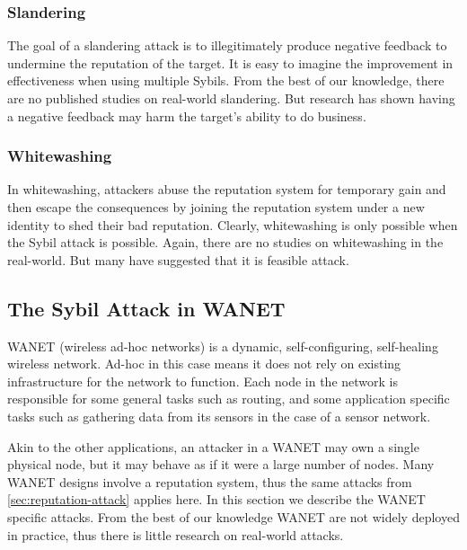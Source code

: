 \subsubsection{Slandering}
The goal of a slandering attack is to illegitimately produce negative feedback
to undermine the reputation of the target. It is easy to imagine the improvement
in effectiveness when using multiple Sybils. From the best of our knowledge,
there are no published studies on real-world slandering. But
research has shown having a negative feedback may harm the target's ability to
do business\cite{ba2002evidence}.

\subsubsection{Whitewashing}
In whitewashing, attackers abuse the reputation system for temporary gain and
then escape the consequences by joining the reputation system under a new
identity to shed their bad reputation. Clearly, whitewashing is only possible
when the Sybil attack is possible. Again, there are no studies on whitewashing
in the real-world. But many have suggested that it is feasible
attack\cite{hoffman2009survey, marti2006taxonomy}.


\subsection{The Sybil Attack in WANET}
WANET (wireless ad-hoc networks) is a dynamic, self-configuring, self-healing
wireless network. Ad-hoc in this case means it does not rely on existing
infrastructure for the network to function. Each node in the network is
responsible for some general tasks such as routing, and some application
specific tasks such as gathering data from its sensors in the case of a sensor
network.

Akin to the other applications, an attacker in a WANET may own a single physical
node, but it may behave as if it were a large number of nodes. Many WANET
designs involve a reputation system\cite{ganeriwal2008reputation,
  buchegger2003robust}, thus the same attacks from
\autoref{sec:reputation-attack} applies here.
In this section we describe the WANET specific attacks. 
From the best of our knowledge WANET are not widely deployed in practice,
thus there is little research on real-world attacks.

